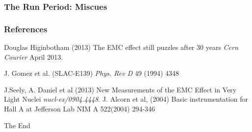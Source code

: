 \documentclass{beamer}
\begin{document}
\begin{frame}
\frametitle{The Run Period: Miscues}
	

\end{frame}





\begin{frame}
\frametitle{References}
\footnotesize{
\begin{thebibliography}{99} %
 Douglas Higinbotham (2013) 
\newblock The EMC effect still puzzles after 30 years
\newblock \emph{Cern Courier} April 2013.

 J. Gomez et al. (SLAC-E139)  
\newblock \emph{Phys. Rev D}  49 (1994) 4348 

 J.Seely, A. Daniel et al (2013) 
\newblock New Measurements of the EMC Effect in Very Light Nuclei
\newblock \emph{nucl-ex/0904.4448}.
 J. Alcorn et al, (2004)
\newblock Basic instrumentation for Hall A at Jefferson Lab
\newblock NIM A 522(2004) 294-346

\end{thebibliography}
}
\end{frame}

\begin{frame}
\Huge{\centerline{The End}}
\end{frame}

\end{document}
